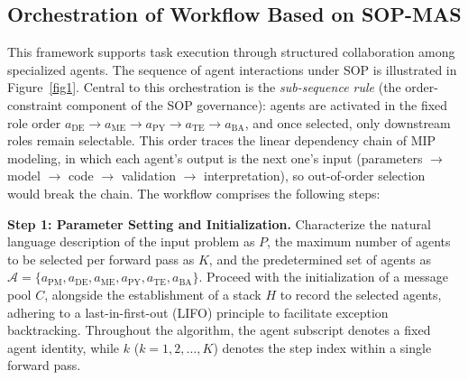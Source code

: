 \documentclass[preprint,12pt]{elsarticle}
\begin{document}
\subsection{Orchestration of Workflow Based on SOP-MAS}

This framework supports task execution through structured collaboration among specialized agents. The sequence of agent interactions under SOP is illustrated in Figure~\ref{fig1}. Central to this orchestration is the \emph{sub-sequence rule} (the order-constraint component of the SOP governance): agents are activated in the fixed role order $a_{\text{DE}} \rightarrow a_{\text{ME}} \rightarrow a_{\text{PY}} \rightarrow a_{\text{TE}} \rightarrow a_{\text{BA}}$, and once selected, only downstream roles remain selectable. This order traces the linear dependency chain of MIP modeling, in which each agent's output is the next one's input (parameters $\rightarrow$ model $\rightarrow$ code $\rightarrow$ validation $\rightarrow$ interpretation), so out-of-order selection would break the chain. The workflow comprises the following steps:

\medskip
\noindent\textbf{Step 1: Parameter Setting and Initialization.}
Characterize the natural language description of the input problem as $P$, the maximum number of agents to be selected per forward pass as $K$, and the predetermined set of agents as $\mathcal{A}=\{a_{\text{PM}}, a_{\text{DE}}, a_{\text{ME}}, a_{\text{PY}}, a_{\text{TE}}, a_{\text{BA}}\}$. Proceed with the initialization of a message pool $C$, alongside the establishment of a stack $H$ to record the selected agents, adhering to a last-in-first-out (LIFO) principle to facilitate exception backtracking. Throughout the algorithm, the agent subscript denotes a fixed agent identity, while $k$ ($k = 1, 2, \ldots, K$) denotes the step index within a single forward pass.
\end{document}
